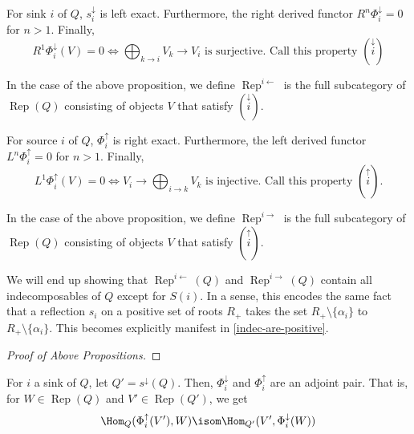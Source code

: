 \documentclass[11pt,leqno,oneside]{amsbook}
\numberwithin{thm}{section}
\newcommand{\Rep}{\operatorname{Rep}} %
\renewcommand{\Q}{Q} %
\newcommand{\sinktosource}{s^\downarrow} %
\newcommand{\sinktosourcefunc}{\Phi^\downarrow} %
\newcommand{\sourcetosinkfunc}{\Phi^\uparrow} %
\newcommand{\roots}{R} %
\begin{document}
\begin{prop}\label{right-derived-func-is-0}
  For sink \(i\) of \(\Q\), \(\sinktosource_i\) is left
  exact. Furthermore, the right derived functor \(R^n \sinktosourcefunc_i
  = 0\) for \(n > 1\). Finally, \[
    R^1 \sinktosourcefunc_i(V) = 0 \iff \bigoplus_{k \to i} V_k \to V_i
    \text{ is surjective. Call this property }\left(\overset{\downarrow}{i}\right)
  \]
\end{prop}
\begin{defn}
  In the case of the above proposition, we define \(\Rep^{i
    \leftarrow}\) is the full subcategory of \(\Rep(\Q)\) consisting
  of objects \(V\) that satisfy \(\left( \overset{\downarrow}{i} \right)\).
\end{defn}
\begin{prop}
  For source \(i\) of \(\Q\), \(\sourcetosinkfunc_i\) is right
  exact. Furthermore, the left derived functor \(L^n
  \sourcetosinkfunc_i = 0\) for \(n > 1\). Finally, \[
    L^1 \sourcetosinkfunc_i (V) = 0 \iff V_i \to \bigoplus_{i \to k}
    V_k \text{ is injective. Call this property } \left(
      \overset{\uparrow}{i} \right).
  \]
\end{prop}
\begin{defn}
  In the case of the above proposition, we define \(\Rep^{i
    \rightarrow}\) is the full subcategory of \(\Rep(\Q)\) consisting
  of objects \(V\) that satisfy \(\left( \overset{\uparrow}{i} \right)\).
\end{defn}
\begin{rmk}
  We will end up showing that \(\Rep^{i \leftarrow}(\Q)\) and
  \(\Rep^{i \rightarrow}(\Q)\) contain all indecomposables of \(\Q\)
  except for \(S(i)\). In a sense, this encodes the same fact that a
  reflection \(s_i\) on a positive set of roots \(\roots_+\) takes the set
  \(\roots_+ \setminus \{\alpha_i\}\) to \(\roots_+ \setminus
  \{\alpha_i\}\). This becomes explicitly manifest in
  \ref{indec-are-positive}. 
\end{rmk}
\begin{proof}[Proof of Above Propositions]
\end{proof}
\begin{prop} \label{source-sink-adjointness}
  For \(i\) a sink of \(\Q\), let \(\Q' = \sinktosource(\Q)\). Then,
  \(\sinktosourcefunc_i\) and \(\sourcetosinkfunc_i\) are an adjoint
  pair. That is, for \(W \in \Rep(\Q)\) and \(V' \in \Rep(\Q')\), we
  get \[
    \Hom_\Q(\sourcetosinkfunc_i(V'), W) \isom \Hom_{\Q'}(V',
    \sinktosourcefunc_i(W)) 
  \]
\end{prop}
\end{document}
